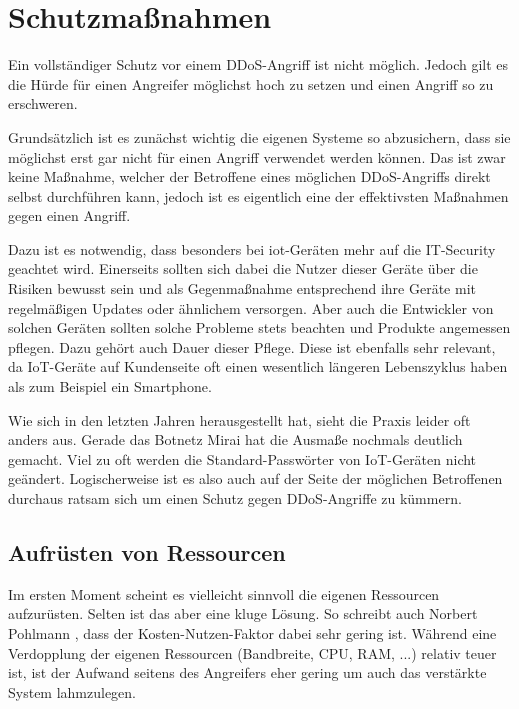 \chapter{Schutzmaßnahmen}
\label{chap:kapitel3}
Ein vollständiger Schutz vor einem DDoS-Angriff ist nicht möglich. Jedoch gilt es die Hürde für einen Angreifer möglichst hoch zu setzen und einen Angriff so zu erschweren.

Grundsätzlich ist es zunächst wichtig die eigenen Systeme so abzusichern, dass sie möglichst erst gar nicht für einen Angriff verwendet werden können. Das ist zwar keine Maßnahme, welcher der Betroffene eines möglichen DDoS-Angriffs direkt selbst durchführen kann, jedoch ist es eigentlich eine der effektivsten Maßnahmen gegen einen Angriff.

Dazu ist es notwendig, dass besonders bei \ac{iot}-Geräten mehr auf die IT-Security geachtet wird. Einerseits sollten sich dabei die Nutzer dieser Geräte über die Risiken bewusst sein und als Gegenmaßnahme entsprechend ihre Geräte mit regelmäßigen Updates oder ähnlichem versorgen.
Aber auch die Entwickler von solchen Geräten sollten solche Probleme stets beachten und Produkte angemessen pflegen. Dazu gehört auch Dauer dieser Pflege. Diese ist ebenfalls sehr relevant, da IoT-Geräte auf Kundenseite oft einen wesentlich längeren Lebenszyklus haben als zum Beispiel ein Smartphone.

Wie sich in den letzten Jahren herausgestellt hat, sieht die Praxis leider oft anders aus. Gerade das Botnetz \glqq Mirai\grqq{} hat die Ausmaße nochmals deutlich gemacht. Viel zu oft werden die Standard-Passwörter von IoT-Geräten nicht geändert.
Logischerweise ist es also auch auf der Seite der möglichen Betroffenen durchaus ratsam sich um einen Schutz gegen DDoS-Angriffe zu kümmern.

\section{Aufrüsten von Ressourcen}
\label{sec:k3rsc}
Im ersten Moment scheint es vielleicht sinnvoll die eigenen Ressourcen aufzurüsten. Selten ist das aber eine kluge Lösung. So schreibt auch Norbert Pohlmann \cite{Pohlmann2019}, dass der Kosten-Nutzen-Faktor dabei sehr gering ist. Während eine Verdopplung der eigenen Ressourcen (Bandbreite, CPU, RAM, ...) relativ teuer ist, ist der Aufwand seitens des Angreifers eher gering um auch das verstärkte System lahmzulegen.

